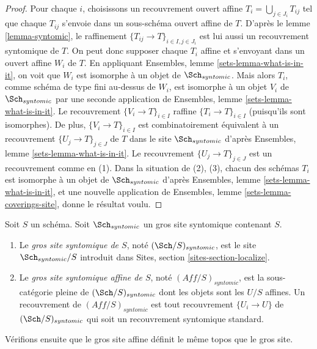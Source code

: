 \begin{proof}
Pour chaque $i$, choisissons un recouvrement ouvert affine $T_i = \bigcup_{j \in J_i} T_{ij}$
tel que chaque $T_{ij}$ s'envoie dans un sous-schéma ouvert affine de $T$. D'après le
lemme \ref{lemma-syntomic},
le raffinement $\{T_{ij} \to T\}_{i \in I, j \in J_i}$ est lui aussi un recouvrement syntomique
de $T$. On peut donc supposer chaque $T_i$ affine et s'envoyant dans
un ouvert affine $W_i$ de $T$. En appliquant
Ensembles, lemme \ref{sets-lemma-what-is-in-it},
on voit que $W_i$ est isomorphe à un objet de $\Sch_{syntomic}$.
Mais alors $T_i$, comme schéma de type fini au-dessus de $W_i$,
est isomorphe à un objet $V_i$ de $\Sch_{syntomic}$ par une seconde
application de
Ensembles, lemme \ref{sets-lemma-what-is-in-it}.
Le recouvrement $\{V_i \to T\}_{i \in I}$ raffine $\{T_i \to T\}_{i \in I}$
(puisqu'ils sont isomorphes).
De plus, $\{V_i \to T\}_{i \in I}$ est combinatoirement équivalent à un
recouvrement $\{U_j \to T\}_{j \in J}$ de $T$ dans le site
$\Sch_{syntomic}$ d'après
Ensembles, lemme \ref{sets-lemma-what-is-in-it}.
Le recouvrement $\{U_j \to T\}_{j \in J}$ est un recouvrement comme en (1).
Dans la situation de (2), (3), chacun des
schémas $T_i$ est isomorphe à un objet de $\Sch_{syntomic}$ d'après
Ensembles, lemme \ref{sets-lemma-what-is-in-it},
et une nouvelle application de
Ensembles, lemme \ref{sets-lemma-coverings-site},
donne le résultat voulu.
\end{proof}

\begin{definition}
\label{definition-big-small-syntomic}
Soit $S$ un schéma. Soit $\Sch_{syntomic}$ un gros site
syntomique contenant $S$.
\begin{enumerate}
\item Le {\it gros site syntomique de $S$}, noté
$(\Sch/S)_{syntomic}$, est le site $\Sch_{syntomic}/S$
introduit dans Sites, section \ref{sites-section-localize}.
\item Le {\it gros site syntomique affine de $S$}, noté
$(\textit{Aff}/S)_{syntomic}$, est la sous-catégorie pleine de
$(\Sch/S)_{syntomic}$ dont les objets sont les $U/S$ affines.
Un recouvrement de $(\textit{Aff}/S)_{syntomic}$ est tout recouvrement
$\{U_i \to U\}$ de $(\Sch/S)_{syntomic}$ qui soit un
recouvrement syntomique standard.
\end{enumerate}
\end{definition}

\noindent
Vérifions ensuite que le gros site affine définit le même
topos que le gros site.

